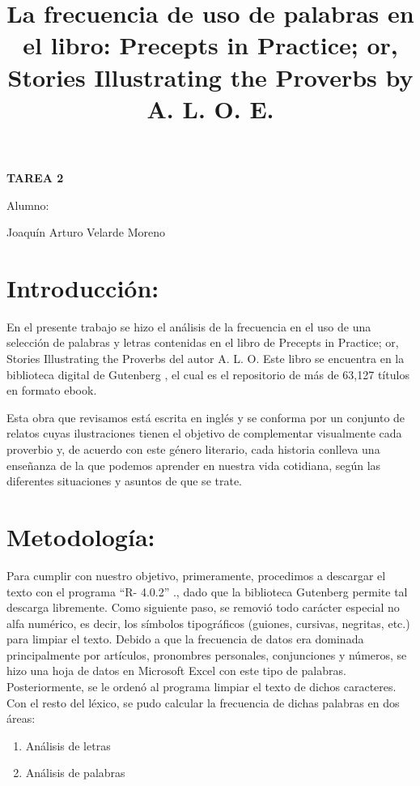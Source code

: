 \documentclass[]{article}
\title{La frecuencia de uso de palabras en el libro:
 Precepts in Practice; or, Stories Illustrating the Proverbs by A. L. O. E.}
\date{}
\begin{document}
	\maketitle
	\begin{center}


\centerline{\textbf{TAREA 2} } 
\textbf{ }

\centerline{Alumno: } 
\centerline{Joaquín Arturo Velarde Moreno}


	\end{center}
	

\section{Introducción:}

En el presente trabajo se hizo el análisis de la frecuencia en el uso de una selección de palabras y letras contenidas en el libro de Precepts in Practice; or, Stories Illustrating the Proverbs del autor A. L. O.  \cite{proverbs} 
Este libro se encuentra en la biblioteca digital de Gutenberg  \cite{guten},  el cual es el repositorio de más de 63,127 títulos en formato ebook.

Esta obra que revisamos está escrita en inglés y se conforma por un conjunto de relatos cuyas ilustraciones tienen el objetivo de complementar visualmente cada proverbio y, de acuerdo con este género literario, cada historia conlleva una enseñanza de la que podemos aprender en nuestra vida cotidiana, según las diferentes situaciones y asuntos de que se trate.

\section{Metodología:}
Para cumplir con nuestro objetivo, primeramente, procedimos a descargar el texto con el programa “R- 4.0.2” \cite{rproject}., dado que la biblioteca Gutenberg \cite{guten} permite tal descarga libremente.
Como siguiente paso, se removió todo carácter especial no alfa numérico, es decir, los símbolos tipográficos (guiones, cursivas, negritas, etc.) para limpiar el texto.
Debido a que la frecuencia de datos era dominada principalmente por artículos, pronombres personales, conjunciones y números, se hizo una hoja de datos en Microsoft Excel \cite{excel} con este tipo de palabras. Posteriormente, se le ordenó al programa limpiar el texto de dichos caracteres.
Con el resto del léxico, se pudo calcular la frecuencia de dichas palabras en dos áreas:


\begin{enumerate}
	\item Análisis de letras
	\item Análisis de palabras

\end{enumerate}
\end{document}
